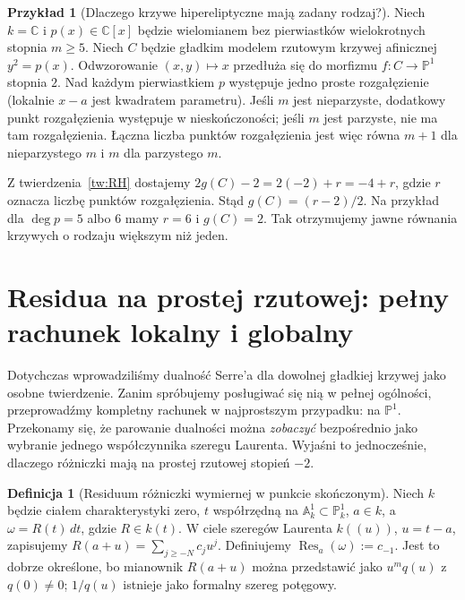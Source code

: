 \documentclass[11pt,a4paper,openany]{report}
\numberwithin{equation}{section}
\theoremstyle{plain}
\theoremstyle{definition}
\newtheorem{definicja}[twierdzenie]{Definicja}
\newtheorem{przyklad}[twierdzenie]{Przykład}
\theoremstyle{remark}
\newcommand{\C}{\mathbb C}
\newcommand{\A}{\mathbb A}
\newcommand{\PP}{\mathbb P}
\begin{document}
\begin{przyklad}[Dlaczego krzywe hipereliptyczne mają zadany rodzaj?]
Niech $k=\C$ i $p(x)\in\C[x]$ będzie wielomianem
bez pierwiastków wielokrotnych stopnia $m\ge5$.
Niech $C$ będzie gładkim modelem rzutowym
krzywej afinicznej $y^2=p(x)$.
Odwzorowanie $(x,y)\mapsto x$ przedłuża się
do morfizmu $f:C\to\PP^1$ stopnia $2$.
Nad każdym pierwiastkiem $p$ występuje jedno
proste rozgałęzienie (lokalnie $x-a$ jest
kwadratem parametru). Jeśli $m$ jest nieparzyste,
dodatkowy punkt rozgałęzienia występuje
w nieskończoności; jeśli $m$ jest parzyste,
nie ma tam rozgałęzienia. Łączna liczba punktów
rozgałęzienia jest więc równa $m+1$ dla
nieparzystego $m$ i $m$ dla parzystego $m$.

Z twierdzenia~\ref{tw:RH} dostajemy
$2g(C)-2=2(-2)+r=-4+r$, gdzie $r$ oznacza
liczbę punktów rozgałęzienia. Stąd
$g(C)=(r-2)/2$.
Na przykład dla $\deg p=5$ albo $6$ mamy
$r=6$ i $g(C)=2$.
Tak otrzymujemy jawne równania krzywych o rodzaju
większym niż jeden.
\end{przyklad}


\section{Residua na prostej rzutowej: pełny rachunek lokalny i globalny}
\label{sec:residua-p1}

Dotychczas wprowadziliśmy dualność Serre'a dla dowolnej gładkiej
krzywej jako osobne twierdzenie. Zanim spróbujemy posługiwać się nią
w pełnej ogólności, przeprowadźmy kompletny rachunek w najprostszym
przypadku: na $\PP^1$. Przekonamy się, że parowanie dualności można
\emph{zobaczyć} bezpośrednio jako wybranie jednego współczynnika
szeregu Laurenta. Wyjaśni to jednocześnie, dlaczego różniczki mają
na prostej rzutowej stopień $-2$.

\begin{definicja}[Residuum różniczki wymiernej w punkcie skończonym]
Niech $k$ będzie ciałem charakterystyki zero,
$t$ współrzędną na $\A^1_k\subset\PP^1_k$, $a\in k$,
a $\omega=R(t)\,dt$, gdzie $R\in k(t)$.
W ciele szeregów Laurenta $k((u))$, $u=t-a$, zapisujemy
$R(a+u)=\sum_{j\ge-N}c_j u^j$.
Definiujemy
$\operatorname{Res}_{a}(\omega):=c_{-1}$.
Jest to dobrze określone, bo mianownik $R(a+u)$ można
przedstawić jako $u^m q(u)$ z $q(0)\ne0$;
$1/q(u)$ istnieje jako formalny szereg potęgowy.
\end{definicja}
\end{document}
